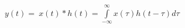 \documentclass[preview]{standalone}
\begin{document}
\begin{center}
{\small $y(t)=$}{\small $\ x(t)*h(t)=$}{\small $\int\limits_{-\infty}^{\infty}x(\tau)h(t-\tau)d\tau$}
\end{center}
\end{document}
